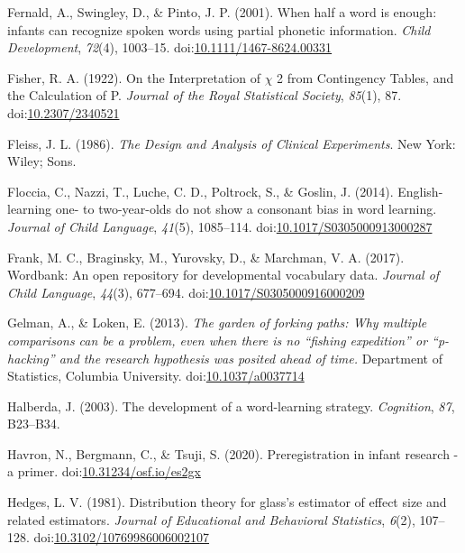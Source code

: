 \documentclass[man]{apa6}
\begin{document}
\leavevmode\hypertarget{ref-Fernald2001a}{}%
Fernald, A., Swingley, D., \& Pinto, J. P. (2001). When half a word is enough: infants can recognize spoken words using partial phonetic information. \emph{Child Development}, \emph{72}(4), 1003--15. doi:\href{https://doi.org/10.1111/1467-8624.00331}{10.1111/1467-8624.00331}

\leavevmode\hypertarget{ref-Fisher1922}{}%
Fisher, R. A. (1922). On the Interpretation of \(\chi\) 2 from Contingency Tables, and the Calculation of P. \emph{Journal of the Royal Statistical Society}, \emph{85}(1), 87. doi:\href{https://doi.org/10.2307/2340521}{10.2307/2340521}

\leavevmode\hypertarget{ref-Fleiss1986}{}%
Fleiss, J. L. (1986). \emph{The Design and Analysis of Clinical Experiments}. New York: Wiley; Sons.

\leavevmode\hypertarget{ref-Floccia2014}{}%
Floccia, C., Nazzi, T., Luche, C. D., Poltrock, S., \& Goslin, J. (2014). English-learning one- to two-year-olds do not show a consonant bias in word learning. \emph{Journal of Child Language}, \emph{41}(5), 1085--114. doi:\href{https://doi.org/10.1017/S0305000913000287}{10.1017/S0305000913000287}

\leavevmode\hypertarget{ref-Frank2017}{}%
Frank, M. C., Braginsky, M., Yurovsky, D., \& Marchman, V. A. (2017). Wordbank: An open repository for developmental vocabulary data. \emph{Journal of Child Language}, \emph{44}(3), 677--694. doi:\href{https://doi.org/10.1017/S0305000916000209}{10.1017/S0305000916000209}

\leavevmode\hypertarget{ref-Gelman2013}{}%
Gelman, A., \& Loken, E. (2013). \emph{The garden of forking paths: Why multiple comparisons can be a problem, even when there is no ``fishing expedition'' or ``p-hacking'' and the research hypothesis was posited ahead of time.} Department of Statistics, Columbia University. doi:\href{https://doi.org/10.1037/a0037714}{10.1037/a0037714}

\leavevmode\hypertarget{ref-Halberda2003}{}%
Halberda, J. (2003). The development of a word-learning strategy. \emph{Cognition}, \emph{87}, B23--B34.

\leavevmode\hypertarget{ref-Havron}{}%
Havron, N., Bergmann, C., \& Tsuji, S. (2020). Preregistration in infant research - a primer. doi:\href{https://doi.org/10.31234/osf.io/es2gx}{10.31234/osf.io/es2gx}

\leavevmode\hypertarget{ref-Hedges1981}{}%
Hedges, L. V. (1981). Distribution theory for glass's estimator of effect size and related estimators. \emph{Journal of Educational and Behavioral Statistics}, \emph{6}(2), 107--128. doi:\href{https://doi.org/10.3102/10769986006002107}{10.3102/10769986006002107}
\end{document}
